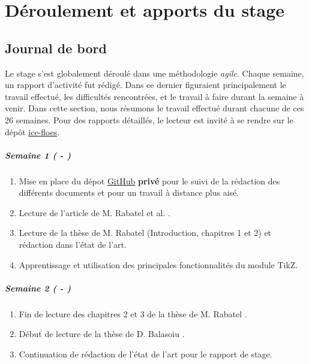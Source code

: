 
\chapter{Déroulement et apports du stage} %

\label{Chapter5} %







\section{Journal de bord}

Le stage s'est globalement déroulé dans une méthodologie \emph{agile}. Chaque semaine, un rapport d'activité fut rédigé. Dans ce dernier figuraient principalement le travail effectué, les difficultés rencontrées, et le travail à faire durant la semaine à venir. Dans cette section, nous résumons le travail effectué durant chacune de ces 26 semaines. Pour des rapports détaillés, le lecteur est invité à se rendre sur le dépôt \href{https://github.com/desmond-rn/ice-floes/tree/master/reports/weeks}{ice-floes}.

\paragraph{Semaine 1 ( - )} 
\begin{enumerate}
    \item Mise en place du dépot \href{https://github.com/desmond-rn/ice-floes}{GitHub} \textbf{privé} pour le suivi de la rédaction des différents documents et pour un travail à distance plus aisé. 
    \item Lecture de l'article de M. Rabatel et al. \parencite{rabatel2015dynamics}.
    \item Lecture de la thèse de M. Rabatel \parencite{rabatel2015thesis} (Introduction, chapitres 1 et 2) et rédaction dans l'état de l'art.
    \item Apprentissage et utilisation des principales fonctionnalités du module TikZ.   
\end{enumerate}
  
\paragraph{Semaine 2 ( - )} 
\begin{enumerate}
    \item Fin de lecture des chapitres 2 et 3 de la thèse de M. Rabatel \parencite{rabatel2015thesis}.
    \item Début de lecture de la thèse de D. Balasoiu \parencite{balasoiu2020halthesis}.
    \item Continuation de rédaction de l'état de l'art pour le rapport de stage.
  \end{enumerate}
  

